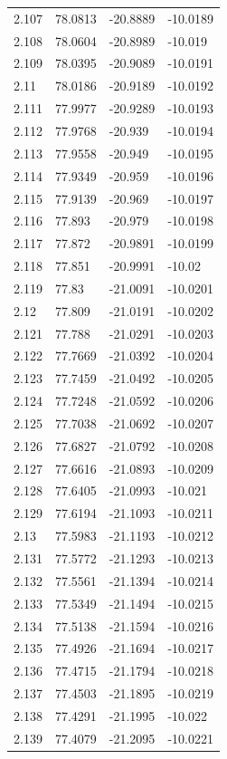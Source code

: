 \begin{tabular}{llll}
2.107 & 78.0813 & -20.8889 & -10.0189 \\
2.108 & 78.0604 & -20.8989 & -10.019 \\
2.109 & 78.0395 & -20.9089 & -10.0191 \\
2.11 & 78.0186 & -20.9189 & -10.0192 \\
2.111 & 77.9977 & -20.9289 & -10.0193 \\
2.112 & 77.9768 & -20.939 & -10.0194 \\
2.113 & 77.9558 & -20.949 & -10.0195 \\
2.114 & 77.9349 & -20.959 & -10.0196 \\
2.115 & 77.9139 & -20.969 & -10.0197 \\
2.116 & 77.893 & -20.979 & -10.0198 \\
2.117 & 77.872 & -20.9891 & -10.0199 \\
2.118 & 77.851 & -20.9991 & -10.02 \\
2.119 & 77.83 & -21.0091 & -10.0201 \\
2.12 & 77.809 & -21.0191 & -10.0202 \\
2.121 & 77.788 & -21.0291 & -10.0203 \\
2.122 & 77.7669 & -21.0392 & -10.0204 \\
2.123 & 77.7459 & -21.0492 & -10.0205 \\
2.124 & 77.7248 & -21.0592 & -10.0206 \\
2.125 & 77.7038 & -21.0692 & -10.0207 \\
2.126 & 77.6827 & -21.0792 & -10.0208 \\
2.127 & 77.6616 & -21.0893 & -10.0209 \\
2.128 & 77.6405 & -21.0993 & -10.021 \\
2.129 & 77.6194 & -21.1093 & -10.0211 \\
2.13 & 77.5983 & -21.1193 & -10.0212 \\
2.131 & 77.5772 & -21.1293 & -10.0213 \\
2.132 & 77.5561 & -21.1394 & -10.0214 \\
2.133 & 77.5349 & -21.1494 & -10.0215 \\
2.134 & 77.5138 & -21.1594 & -10.0216 \\
2.135 & 77.4926 & -21.1694 & -10.0217 \\
2.136 & 77.4715 & -21.1794 & -10.0218 \\
2.137 & 77.4503 & -21.1895 & -10.0219 \\
2.138 & 77.4291 & -21.1995 & -10.022 \\
2.139 & 77.4079 & -21.2095 & -10.0221 \\

\end{tabular}
